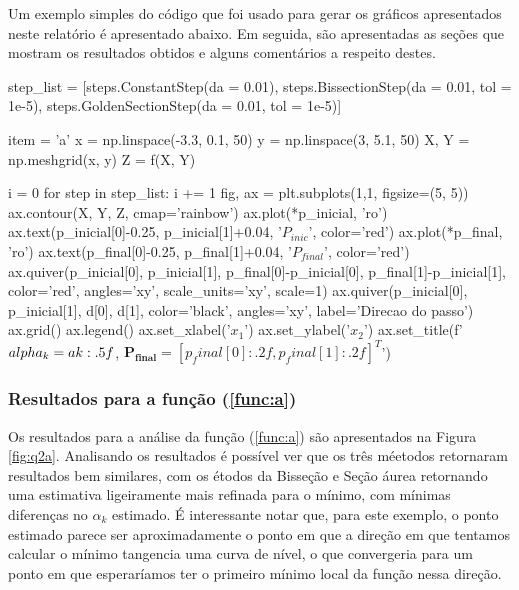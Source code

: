 \documentclass[10pt, a4paper]{article}
\begin{document}
Um exemplo simples do código que foi usado para gerar os gráficos apresentados neste relatório é apresentado abaixo. 
Em seguida, são apresentadas as seções que mostram os resultados obtidos e alguns comentários a respeito destes.


\begin{python}
step_list   = [steps.ConstantStep(da = 0.01), steps.BissectionStep(da = 0.01, tol = 1e-5), steps.GoldenSectionStep(da = 0.01, tol = 1e-5)]

item = 'a'
x = np.linspace(-3.3, 0.1, 50)
y = np.linspace(3, 5.1, 50)
X, Y = np.meshgrid(x, y)
Z = f(X, Y)

i = 0
for step in step_list:
    i += 1
    fig, ax = plt.subplots(1,1, figsize=(5, 5))
    ax.contour(X, Y, Z, cmap='rainbow')
    ax.plot(*p_inicial, 'ro')
    ax.text(p_inicial[0]-0.25, p_inicial[1]+0.04, '$P_{inic}$', color='red')
    ax.plot(*p_final, 'ro')
    ax.text(p_final[0]-0.25, p_final[1]+0.04, '$P_{final}$', color='red')
    ax.quiver(p_inicial[0], p_inicial[1], p_final[0]-p_inicial[0], p_final[1]-p_inicial[1], color='red', angles='xy', scale_units='xy', scale=1)
    ax.quiver(p_inicial[0], p_inicial[1], d[0], d[1], color='black', angles='xy', label='Direcao do passo')
    ax.grid()
    ax.legend()
    ax.set_xlabel('$x_1$')
    ax.set_ylabel('$x_2$')
    ax.set_title(f'$\\alpha_k = {ak:.5f}$, $\mathbf{{P_{{final}}}} = [{p_final[0]:.2f}, {p_final[1]:.2f}]^T$')
\end{python}
\subsubsection{Resultados para a função (\ref{func:a})}

Os resultados para a análise da função (\ref{func:a}) são apresentados na Figura \ref{fig:q2a}. Analisando os resultados
é possível ver que os três méetodos retornaram resultados bem similares, com os étodos da Bisseção e Seção áurea retornando
uma estimativa ligeiramente mais refinada para o mínimo, com mínimas diferenças no $\alpha_k$ estimado. É interessante notar que,
para este exemplo, o ponto estimado parece ser aproximadamente o ponto em que a direção em que tentamos calcular o mínimo
tangencia uma curva de nível, o que convergeria para um ponto em que esperaríamos ter o primeiro mínimo local da função nessa direção.
\end{document}
